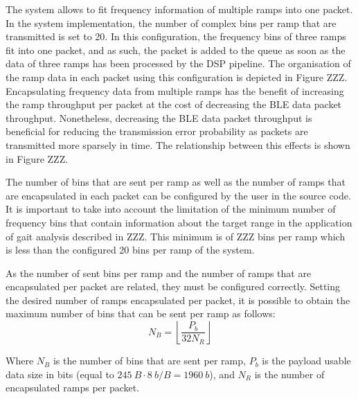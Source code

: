 The system allows to fit frequency information of multiple ramps into one packet. In the system implementation, the number of complex bins per ramp that are transmitted is set to 20. In this configuration, the frequency bins of three ramps fit into one packet, and as such, the packet is added to the queue as soon as the data of three ramps has been processed by the DSP pipeline. The organisation of the ramp data in each packet using this configuration is depicted in Figure ZZZ. Encapsulating frequency data from multiple ramps has the benefit of increasing the ramp throughput per packet at the cost of decreasing the BLE data packet throughput. Nonetheless, decreasing the BLE data packet throughput is beneficial for reducing the transmission error probability as packets are transmitted more sparsely in time. The relationship between this effects is shown in Figure ZZZ.

The number of bins that are sent per ramp as well as the number of ramps that are encapsulated in each packet can be configured by the user in the source code. It is important to take into account the limitation of the minimum number of frequency bins that contain information about the target range in the application of gait analysis described in ZZZ. This minimum is of ZZZ bins per ramp which is less than the configured 20 bins per ramp of the system. %

As the number of sent bins per ramp and the number of ramps that are encapsulated per packet are related, they must be configured correctly. Setting the desired number of ramps encapsulated per packet, it is possible to obtain the maximum number of bins that can be sent per ramp as follows:
\begin{equation}
	N_B = \left\lfloor \frac{P_b}{32 N_R} \right\rfloor
\end{equation}

Where $N_B$ is the number of bins that are sent per ramp, $P_b$ is the payload usable data size in bits (equal to $\SI{245}{B} \cdot \SI{8}{b\per B} = \SI{1960}{b}$), and $N_R$ is the number of encapsulated ramps per packet.

